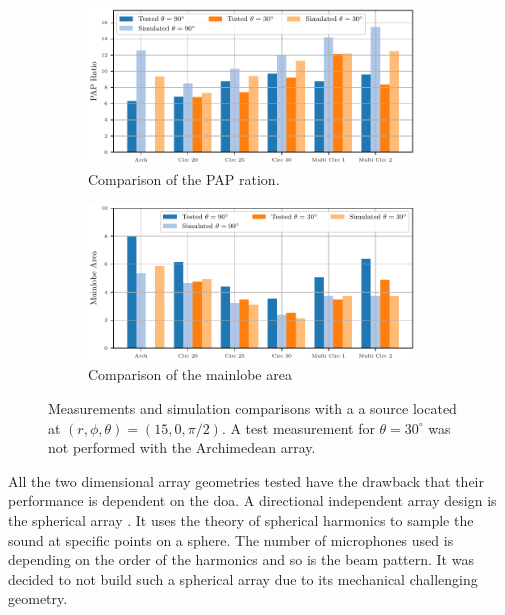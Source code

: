 \begin{figure}[h]
	\centering
	\begin{subfigure}[b]{1\textwidth}
		\centering
		\includegraphics[width=0.95\textwidth]{images/5_array_evaluation/PapTestSim.pdf}
		\caption{Comparison of the PAP ration.}
		\label{fig:comp1}
	\end{subfigure}
	\begin{subfigure}[b]{1\textwidth}
		\centering
		\includegraphics[width=0.95\textwidth]{images/5_array_evaluation/AreaTestSim.pdf}
		\caption{Comparison of the mainlobe area}
		\label{fig:comp2}
	\end{subfigure}
	\caption{Measurements and simulation comparisons with a a source located at $(r, \phi, \theta) = (15, 0, \pi/2)$.
	A test measurement for $\theta = 30^\circ$ was not performed with the Archimedean array.}
	\label{fig:TestSim}
\end{figure}

All the two dimensional array geometries tested have the drawback
that their performance is dependent on the \acrshort*{doa}.
A directional independent array design is the spherical array \cite{Rafaely2010}.
It uses the theory of spherical harmonics to sample the sound at specific points
on a sphere.
The number of microphones used is depending on the order of the harmonics and so
is the beam pattern.
It was decided to not build such a spherical array due to its mechanical
challenging geometry.

